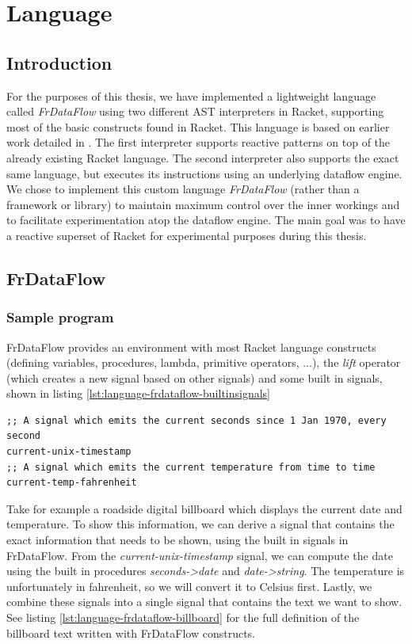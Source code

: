 \chapter{Language}
\lstset{language=lisp,showtabs=false}

\section{Introduction}

For the purposes of this thesis, we have implemented a lightweight language called \textit{FrDataFlow} using two different AST interpreters in Racket, supporting most of the basic constructs found in Racket. This language is based on earlier work detailed in \citet{abelson_structure_1999}. The first interpreter supports reactive patterns on top of the already existing Racket language. The second interpreter also supports the exact same language, but executes its instructions using an underlying dataflow engine. We chose to implement this custom language \textit{FrDataFlow} (rather than a framework or library) to maintain maximum control over the inner workings and to facilitate experimentation atop the dataflow engine. The main goal was to have a reactive superset of Racket for experimental purposes during this thesis.

\newpage
\section{FrDataFlow}


\subsection{Sample program}

FrDataFlow provides an environment with most Racket language constructs (defining variables, procedures, lambda, primitive operators, ...), the \textit{lift} operator (which creates a new signal based on other signals) and some built in signals, shown in listing \ref{lst:language-frdataflow-builtinsignals}

\begin{lstlisting}[caption={Built in signals},captionpos=b,label={lst:language-frdataflow-builtinsignals}]
;; A signal which emits the current seconds since 1 Jan 1970, every second
current-unix-timestamp	
;; A signal which emits the current temperature from time to time
current-temp-fahrenheit 
\end{lstlisting}

Take for example a roadside digital billboard which displays the current date and temperature. To show this information, we can derive a signal that contains the exact information that needs to be shown, using the built in signals in FrDataFlow. 
From the \textit{current-unix-timestamp} signal, we can compute the date using the built in procedures \textit{seconds->date} and \textit{date->string}. The temperature is unfortunately in fahrenheit, so we will convert it to Celsius first. Lastly, we combine these signals into a single signal that contains the text we want to show. See listing \ref{lst:language-frdataflow-billboard} for the full definition of the billboard text written with FrDataFlow constructs. 

